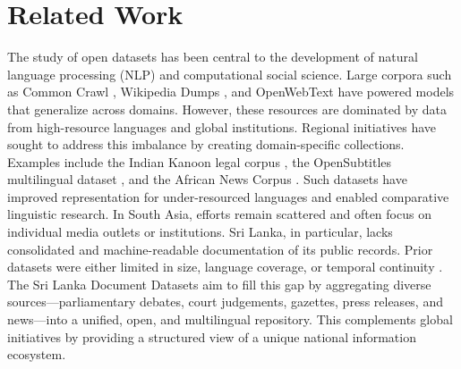 \documentclass[10pt,a4paper,twocolumn]{article}%
\begin{document}
%
\section{Related Work}%
\label{sec:RelatedWork}%
The study of open datasets has been central to the development of natural language processing (NLP) and computational social science. Large corpora such as Common Crawl%
\cite{commoncrawl2020}%
, Wikipedia Dumps%
\cite{wikidumps2018}%
, and OpenWebText%
\cite{openwebtext2019}%
have powered models that generalize across domains. However, these resources are dominated by data from high{-}resource languages and global institutions.%
\newline%
\newline%
Regional initiatives have sought to address this imbalance by creating domain{-}specific collections. Examples include the Indian Kanoon legal corpus%
\cite{indiankanoon2018}%
, the OpenSubtitles multilingual dataset%
\cite{opensubtitles2016}%
, and the African News Corpus%
\cite{africannews2021}%
. Such datasets have improved representation for under{-}resourced languages and enabled comparative linguistic research.%
\newline%
\newline%
In South Asia, efforts remain scattered and often focus on individual media outlets or institutions. Sri Lanka, in particular, lacks consolidated and machine{-}readable documentation of its public records. Prior datasets were either limited in size, language coverage, or temporal continuity%
\cite{sltalk2023}%
%
\cite{srilankanlp2022}%
.%
\newline%
\newline%
The Sri Lanka Document Datasets aim to fill this gap by aggregating diverse sources—parliamentary debates, court judgements, gazettes, press releases, and news—into a unified, open, and multilingual repository. This complements global initiatives by providing a structured view of a unique national information ecosystem.%
\newline%
\newline

%
\end{document}
